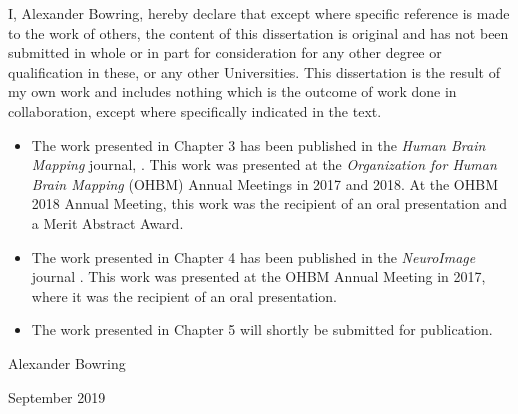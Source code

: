 \documentclass[11pt,a4paper]{report}      %
\begin{document}
\begin{thesisdeclaration}        
I, Alexander Bowring, hereby declare that except where specific reference is made to the work of others, the content of this dissertation is original and has not been submitted in whole or in part for consideration for any other degree or qualification in these, or any other Universities. This dissertation is the result of my own work and includes nothing which is the outcome of work done in collaboration, except where specifically indicated in the text.

\begin{itemize}
\item The work presented in Chapter 3 has been published in the \textit{Human Brain Mapping} journal, \textit{\citet*{Bowring2019-fc}}. This work was presented at the \textit{Organization for Human Brain Mapping} (OHBM) Annual Meetings in 2017 and 2018. At the OHBM 2018 Annual Meeting, this work was the recipient of an oral presentation and a Merit Abstract Award. 
 
\item The work presented in Chapter 4 has been published in the \textit{NeuroImage} journal \textit{\citet*{BOWRING2019116187}}. This work was presented at the OHBM Annual Meeting in 2017, where it was the recipient of an oral presentation. 

\item The work presented in Chapter 5 will shortly be submitted for publication.
\end{itemize}

\vspace{2cm}
\hspace{-1.2cm}
Alexander Bowring 

\hspace{-1.2cm}
September 2019

\tableofcontents                     %






\end{thesisdeclaration}
\end{document}
